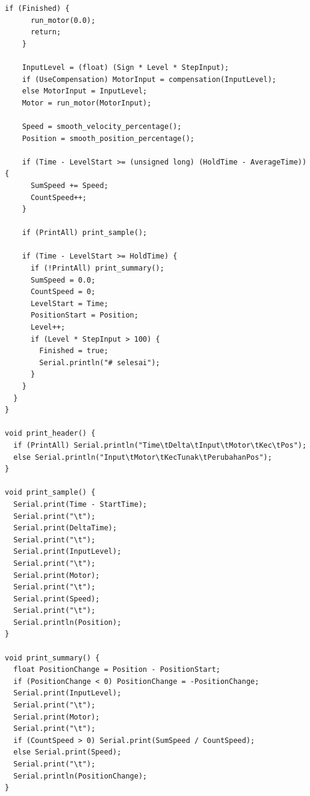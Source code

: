 \documentclass[11pt,a4paper]{article}
\begin{document}
\begin{lstlisting}[caption={Program utama \texttt{6\_main\_statik}},label={lst:statik}]
    if (Finished) {
      run_motor(0.0);
      return;
    }

    InputLevel = (float) (Sign * Level * StepInput);
    if (UseCompensation) MotorInput = compensation(InputLevel);
    else MotorInput = InputLevel;
    Motor = run_motor(MotorInput);

    Speed = smooth_velocity_percentage();
    Position = smooth_position_percentage();

    if (Time - LevelStart >= (unsigned long) (HoldTime - AverageTime)) {
      SumSpeed += Speed;
      CountSpeed++;
    }

    if (PrintAll) print_sample();

    if (Time - LevelStart >= HoldTime) {
      if (!PrintAll) print_summary();
      SumSpeed = 0.0;
      CountSpeed = 0;
      LevelStart = Time;
      PositionStart = Position;
      Level++;
      if (Level * StepInput > 100) {
        Finished = true;
        Serial.println("# selesai");
      }
    }
  }
}

void print_header() {
  if (PrintAll) Serial.println("Time\tDelta\tInput\tMotor\tKec\tPos");
  else Serial.println("Input\tMotor\tKecTunak\tPerubahanPos");
}

void print_sample() {
  Serial.print(Time - StartTime);
  Serial.print("\t");
  Serial.print(DeltaTime);
  Serial.print("\t");
  Serial.print(InputLevel);
  Serial.print("\t");
  Serial.print(Motor);
  Serial.print("\t");
  Serial.print(Speed);
  Serial.print("\t");
  Serial.println(Position);
}

void print_summary() {
  float PositionChange = Position - PositionStart;
  if (PositionChange < 0) PositionChange = -PositionChange;
  Serial.print(InputLevel);
  Serial.print("\t");
  Serial.print(Motor);
  Serial.print("\t");
  if (CountSpeed > 0) Serial.print(SumSpeed / CountSpeed);
  else Serial.print(Speed);
  Serial.print("\t");
  Serial.println(PositionChange);
}
\end{lstlisting}
\end{document}
